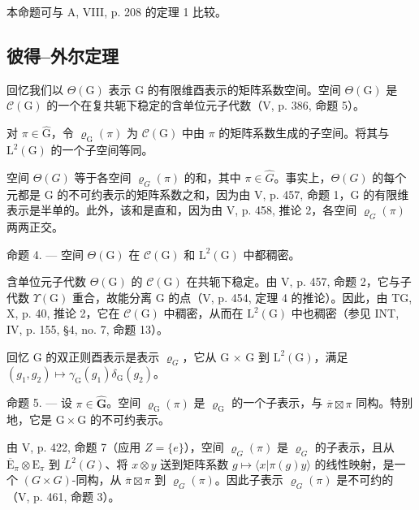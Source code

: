 本命题可与 A, VIII, p. 208 的定理 1 比较。

\subsection{彼得--外尔定理}

回忆我们以 \(\Theta(\mathrm{G})\) 表示 G 的有限维酉表示的矩阵系数空间。空间 \(\Theta(\mathrm{G})\) 是 \(\mathcal{C}(\mathrm{G})\) 的一个在复共轭下稳定的含单位元子代数（V, p. 386, 命题 5）。

对 \(\pi \in \widehat{\mathrm{G}}\)，令 \(\varrho_{\mathrm{G}}(\pi)\) 为 \(\mathcal{C}(\mathrm{G})\) 中由 \(\pi\) 的矩阵系数生成的子空间。将其与 \(\mathrm{L}^2 (\mathrm{G})\) 的一个子空间等同。

空间 \(\Theta(G)\) 等于各空间 \(\varrho_{G}(\pi)\) 的和，其中 \(\pi\in\widehat{G}\)。事实上，\(\Theta(G)\) 的每个元都是 G 的不可约表示的矩阵系数之和，因为由 V, p. 457, 命题 1，G 的有限维表示是半单的。此外，该和是直和，因为由 V, p. 458, 推论 2，各空间 \(\varrho_{G}(\pi)\) 两两正交。

命题 4. — 空间 \(\Theta(\mathrm{G})\) 在 \(\mathcal{C}(\mathrm{G})\) 和 \(\mathrm{L}^2(\mathrm{G})\) 中都稠密。

含单位元子代数 \(\Theta(\mathrm{G})\) 的 \(\mathcal{C}(\mathrm{G})\) 在共轭下稳定。由 V, p. 457, 命题 2，它与子代数 \(\Upsilon(\mathrm{G})\) 重合，故能分离 G 的点（V, p. 454, 定理 4 的推论）。因此，由 TG, X, p. 40, 推论 2，它在 \(\mathcal{C}(\mathrm{G})\) 中稠密，从而在 \(\mathrm{L}^2(\mathrm{G})\) 中也稠密（参见 INT, IV, p. 155, §4, no. 7, 命题 13）。

回忆 G 的双正则酉表示是表示 \(\varrho_{G}\)，它从 G × G 到 \(\mathrm{L}^{2}(\mathrm{G})\)，满足 \((g_{1}, g_{2}) \mapsto \gamma_{\mathrm{G}}(g_{1}) \delta_{\mathrm{G}}(g_{2})\)。

命题 5. --- 设 \(\pi \in \widehat{\mathbf{G}}\)。空间 \(\varrho_{\mathrm{G}}(\pi)\) 是 \(\varrho_{\mathrm{G}}\) 的一个子表示，与 \(\overline{\pi} \boxtimes \pi\) 同构。特别地，它是 \(\mathrm{G} \times \mathrm{G}\) 的不可约表示。

由 V, p. 422, 命题 7（应用 \(Z = \{e\}\)），空间 \(\varrho_{G}(\pi)\) 是 \(\varrho_{G}\) 的子表示，且从 \(\overline{\mathrm{E}}_{\pi} \otimes \mathrm{E}_{\pi}\) 到 \(L^2(G)\)、将 \(x \otimes y\) 送到矩阵系数 \(g \mapsto \langle x | \pi(g)y \rangle\) 的线性映射，是一个 \((G \times G)\)-同构，从 \(\overline{\pi} \boxtimes \pi\) 到 \(\varrho_{G}(\pi)\)。因此子表示 \(\varrho_{G}(\pi)\) 是不可约的（V, p. 461, 命题 3）。

